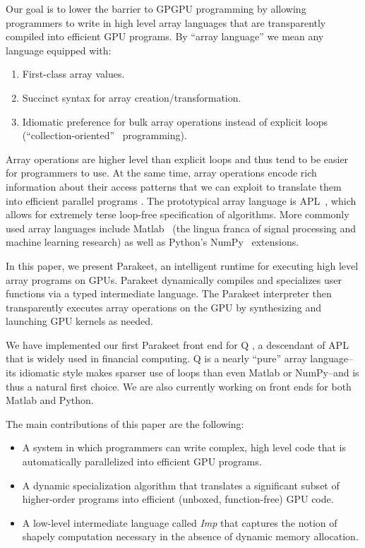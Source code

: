\documentclass[preprint]{sigplanconf}
\begin{document}
Our goal is to lower the barrier to GPGPU programming by allowing programmers to
write in high level array languages that are transparently compiled into
efficient GPU programs. By ``array language'' we mean any language equipped
with:
\begin{enumerate}
\item First-class array values.
\item Succinct syntax for array creation/transformation.
\item Idiomatic preference for bulk array operations instead of explicit loops
(``collection-oriented''~\cite{Sip91} programming).
\end{enumerate}

Array operations are higher level than explicit loops and thus tend
to be easier for programmers to use. At the same time, array operations encode
rich information about their access patterns that we can exploit to translate
them into efficient parallel programs \cite{Ju94}. The prototypical array
language is APL~\cite{Iverson62}, which allows for extremely terse loop-free
specification of algorithms. More commonly used array languages include
Matlab~\cite{Moler80} (the lingua franca of signal processing and machine
learning research) as well as Python's NumPy~\cite{Oliphant07} extensions.

In this paper, we present Parakeet, an intelligent runtime for executing high
level array programs on GPUs. Parakeet dynamically compiles and specializes user
functions via a typed intermediate language.  The Parakeet interpreter then
transparently executes array operations on the GPU by synthesizing and launching
GPU kernels as needed.


We have implemented our first Parakeet front end for Q \cite{Borr08}, a
descendant of APL that is widely used in financial computing. 
Q is a nearly ``pure'' array language--its idiomatic style makes sparser use of
loops than even Matlab or NumPy--and is thus a natural first choice.
We are also currently working on front ends for both Matlab and Python.

The main contributions of this paper are the following:

\begin{itemize}
\item A system in which programmers can write complex, high level code
that is automatically parallelized into efficient GPU programs.

\item A dynamic specialization algorithm that translates a significant subset of
higher-order programs into efficient (unboxed, function-free) GPU code.

\item A low-level intermediate language called \textit{Imp} that captures the
notion of shapely computation \cite{Jay97} necessary in the absence of dynamic
memory allocation.
\end{itemize}
\end{document}
